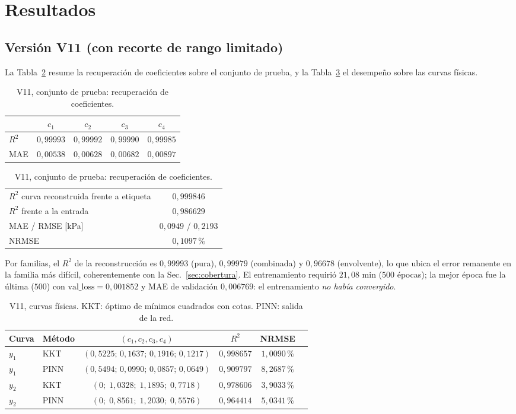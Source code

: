 \documentclass[11pt,twoside]{article}
\theoremstyle{definition}
\theoremstyle{remark}
\begin{document}
\section{Resultados}\label{sec:res}
\subsection{Versión V11 (con recorte de rango limitado)}
La Tabla~\ref{tab:v11c} resume la recuperación de coeficientes sobre el conjunto de prueba, y la Tabla~\ref{tab:v11y} el desempeño sobre las curvas físicas.

\begin{table}[ht]
\centering
\caption{V11, conjunto de prueba: recuperación de coeficientes.}\label{tab:v11c}
\begin{tabular}{lcccc}
\toprule
 & $c_1$ & $c_2$ & $c_3$ & $c_4$\\
\midrule
$R^2$ & $0{,}99993$ & $0{,}99992$ & $0{,}99990$ & $0{,}99985$\\
MAE & $0{,}00538$ & $0{,}00628$ & $0{,}00682$ & $0{,}00897$\\
\bottomrule
\end{tabular}

\vspace{4pt}
\begin{tabular}{lc}
\toprule
$R^2$ curva reconstruida frente a etiqueta & $0{,}999846$\\
$R^2$ frente a la entrada & $0{,}986629$\\
MAE / RMSE [kPa] & $0{,}0949$ / $0{,}2193$\\
NRMSE & $0{,}1097\,\%$\\
\bottomrule
\end{tabular}
\end{table}

Por familias, el $R^2$ de la reconstrucción es $0{,}99993$ (pura), $0{,}99979$ (combinada) y $0{,}96678$ (envolvente), lo que ubica el error remanente en la familia más difícil, coherentemente con la Sec.~\ref{sec:cobertura}. El entrenamiento requirió $21{,}08$ min ($500$ épocas); la mejor época fue la última ($500$) con $\text{val\_loss}=0{,}001852$ y MAE de validación $0{,}006769$: el entrenamiento \emph{no había convergido}.

\begin{table}[ht]
\centering
\caption{V11, curvas físicas. KKT: óptimo de mínimos cuadrados con cotas. PINN: salida de la red.}\label{tab:v11y}
\small
\begin{tabular}{llcccc}
\toprule
Curva & Método & $(c_1,c_2,c_3,c_4)$ & $R^2$ & NRMSE\\
\midrule
$y_1$ & KKT & $(0{,}5225;\,0{,}1637;\,0{,}1916;\,0{,}1217)$ & $0{,}998657$ & $1{,}0090\,\%$\\
$y_1$ & PINN & $(0{,}5494;\,0{,}0990;\,0{,}0857;\,0{,}0649)$ & $0{,}909797$ & $8{,}2687\,\%$\\
$y_2$ & KKT & $(0;\;1{,}0328;\;1{,}1895;\;0{,}7718)$ & $0{,}978606$ & $3{,}9033\,\%$\\
$y_2$ & PINN & $(0;\;0{,}8561;\;1{,}2030;\;0{,}5576)$ & $0{,}964414$ & $5{,}0341\,\%$\\
\bottomrule
\end{tabular}
\end{table}
\end{document}
